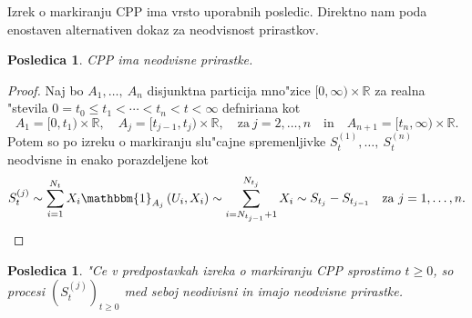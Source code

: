 \documentclass[12pt, a4paper, reqno]{amsart}
\theoremstyle{definition}
\theoremstyle{plain}
\newtheorem{posledica}[definicija]{Posledica}
\newcommand{\R}{\mathbb{R}}
\newcommand{\1}{\mathds{1}}
\begin{document}
        Izrek o markiranju CPP ima vrsto uporabnih posledic. Direktno nam poda enostaven
        alternativen dokaz za neodvisnost prirastkov.

        \begin{posledica}
            CPP ima neodvisne prirastke.
        \end{posledica}

        \begin{proof}
            Naj bo $A_1, \dots, \ A_n$ disjunktna particija 
            mno"zice $[0, \infty) \times \R$ za realna "stevila $0=t_0\leq t_1 < \cdots < t_n < t < \infty$ defniriana kot
            \begin{equation*}
                A_1 = [0, t_1)\times \R, \quad A_j = [t_{j-1}, t_j)\times \R, \quad \text{za} \ j = 2, \dots, n \quad \text{in} \quad A_{n + 1} = [t_{n}, \infty)\times \R.
            \end{equation*}
            Potem so po izreku o markiranju slu"cajne spremenljivke $S_{t}^{(1)}, \dots, \ S_{t}^{(n)}$ neodvisne in enako
            porazdeljene kot 
            \begin{align*}
                S^{(j)}_{t} \sim \sum_{i=1}^{N_t}X_i\mathbbm{1}_{A_j}\left(U_i, X_i\right)\sim
                \sum_{i = N_{t_{j-1}}+ 1}^{N_{t_j}}X_i \sim S_{t_j} - S_{t_{j-1}} \quad \text{za} \ j = 1, \dots, n.
            \end{align*}
        \end{proof}

        \begin{posledica}
            "Ce v predpostavkah izreka o markiranju CPP sprostimo $t\geq0$, so procesi $(S_t^{(j)})_{t\geq0}$ 
            med seboj neodivisni in imajo neodvisne prirastke. 
        \end{posledica}
\end{document}
